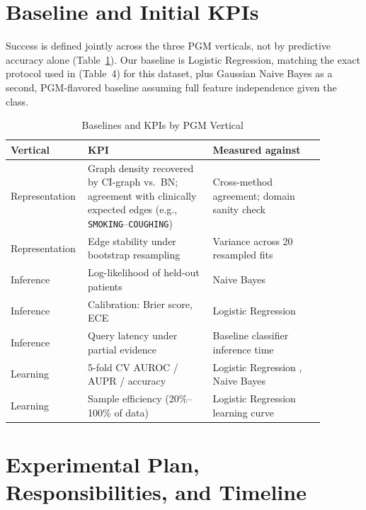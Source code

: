 \documentclass[conference]{IEEEtran}
\begin{document}
	\section{Baseline and Initial KPIs}
	\label{sec:kpi}
	Success is defined jointly across the three PGM verticals, not by predictive accuracy alone (Table~\ref{tab:kpi}). Our baseline is Logistic Regression, matching the exact protocol used in \cite{ngm2022} (Table~4) for this dataset, plus Gaussian Naive Bayes as a second, PGM-flavored baseline assuming full feature independence given the class.
	
	\begin{table}[htbp]
		\caption{Baselines and KPIs by PGM Vertical}
		\label{tab:kpi}
		\centering
		\begin{tabular}{p{0.16\linewidth} p{0.38\linewidth} p{0.34\linewidth}}
			\toprule
			\textbf{Vertical} & \textbf{KPI} & \textbf{Measured against} \\
			\midrule
			Representation & Graph density recovered by CI-graph vs.\ BN; agreement with clinically expected edges (e.g., \texttt{SMOKING}--\texttt{COUGHING}) & Cross-method agreement; domain sanity check \\
			Representation & Edge stability under bootstrap resampling & Variance across 20 resampled fits \\
			Inference & Log-likelihood of held-out patients & Naive Bayes \\
			Inference & Calibration: Brier score, ECE & Logistic Regression \\
			Inference & Query latency under partial evidence & Baseline classifier inference time \\
			Learning & 5-fold CV AUROC / AUPR / accuracy & Logistic Regression \cite{ngm2022}, Naive Bayes \\
			Learning & Sample efficiency (20\%--100\% of data) & Logistic Regression learning curve \\
			\bottomrule
		\end{tabular}
	\end{table}
	
	\section{Experimental Plan, Responsibilities, and Timeline}
	
\end{document}
